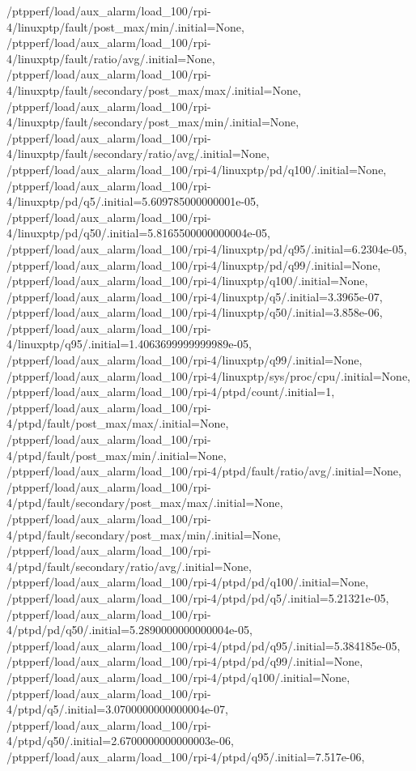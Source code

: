 {    /ptpperf/load/aux_alarm/load_100/rpi-4/linuxptp/fault/post_max/min/.initial=None,
    /ptpperf/load/aux_alarm/load_100/rpi-4/linuxptp/fault/ratio/avg/.initial=None,
    /ptpperf/load/aux_alarm/load_100/rpi-4/linuxptp/fault/secondary/post_max/max/.initial=None,
    /ptpperf/load/aux_alarm/load_100/rpi-4/linuxptp/fault/secondary/post_max/min/.initial=None,
    /ptpperf/load/aux_alarm/load_100/rpi-4/linuxptp/fault/secondary/ratio/avg/.initial=None,
    /ptpperf/load/aux_alarm/load_100/rpi-4/linuxptp/pd/q100/.initial=None,
    /ptpperf/load/aux_alarm/load_100/rpi-4/linuxptp/pd/q5/.initial=5.609785000000001e-05,
    /ptpperf/load/aux_alarm/load_100/rpi-4/linuxptp/pd/q50/.initial=5.8165500000000004e-05,
    /ptpperf/load/aux_alarm/load_100/rpi-4/linuxptp/pd/q95/.initial=6.2304e-05,
    /ptpperf/load/aux_alarm/load_100/rpi-4/linuxptp/pd/q99/.initial=None,
    /ptpperf/load/aux_alarm/load_100/rpi-4/linuxptp/q100/.initial=None,
    /ptpperf/load/aux_alarm/load_100/rpi-4/linuxptp/q5/.initial=3.3965e-07,
    /ptpperf/load/aux_alarm/load_100/rpi-4/linuxptp/q50/.initial=3.858e-06,
    /ptpperf/load/aux_alarm/load_100/rpi-4/linuxptp/q95/.initial=1.4063699999999989e-05,
    /ptpperf/load/aux_alarm/load_100/rpi-4/linuxptp/q99/.initial=None,
    /ptpperf/load/aux_alarm/load_100/rpi-4/linuxptp/sys/proc/cpu/.initial=None,
    /ptpperf/load/aux_alarm/load_100/rpi-4/ptpd/count/.initial=1,
    /ptpperf/load/aux_alarm/load_100/rpi-4/ptpd/fault/post_max/max/.initial=None,
    /ptpperf/load/aux_alarm/load_100/rpi-4/ptpd/fault/post_max/min/.initial=None,
    /ptpperf/load/aux_alarm/load_100/rpi-4/ptpd/fault/ratio/avg/.initial=None,
    /ptpperf/load/aux_alarm/load_100/rpi-4/ptpd/fault/secondary/post_max/max/.initial=None,
    /ptpperf/load/aux_alarm/load_100/rpi-4/ptpd/fault/secondary/post_max/min/.initial=None,
    /ptpperf/load/aux_alarm/load_100/rpi-4/ptpd/fault/secondary/ratio/avg/.initial=None,
    /ptpperf/load/aux_alarm/load_100/rpi-4/ptpd/pd/q100/.initial=None,
    /ptpperf/load/aux_alarm/load_100/rpi-4/ptpd/pd/q5/.initial=5.21321e-05,
    /ptpperf/load/aux_alarm/load_100/rpi-4/ptpd/pd/q50/.initial=5.2890000000000004e-05,
    /ptpperf/load/aux_alarm/load_100/rpi-4/ptpd/pd/q95/.initial=5.384185e-05,
    /ptpperf/load/aux_alarm/load_100/rpi-4/ptpd/pd/q99/.initial=None,
    /ptpperf/load/aux_alarm/load_100/rpi-4/ptpd/q100/.initial=None,
    /ptpperf/load/aux_alarm/load_100/rpi-4/ptpd/q5/.initial=3.0700000000000004e-07,
    /ptpperf/load/aux_alarm/load_100/rpi-4/ptpd/q50/.initial=2.6700000000000003e-06,
    /ptpperf/load/aux_alarm/load_100/rpi-4/ptpd/q95/.initial=7.517e-06,
}
